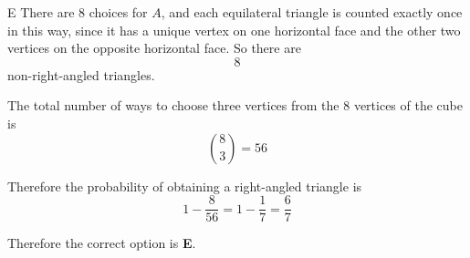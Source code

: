 \documentclass[11pt,a4paper]{article}
\begin{document}
\begin{enumerate}[label=\textbf{\arabic*.},leftmargin=*,itemsep=0pt,start=14]
\begin{djsSolution}{E}
There are $8$ choices for $A$, and each equilateral triangle is counted exactly once in this way, since it has a unique vertex on one horizontal face and the other two vertices on the opposite horizontal face. So there are
\[
8
\]
non-right-angled triangles.

The total number of ways to choose three vertices from the $8$ vertices of the cube is
\[
\binom{8}{3}=56
\]

Therefore the probability of obtaining a right-angled triangle is
\[
1-\frac{8}{56}=1-\frac17=\frac67
\]

Therefore the correct option is \textbf{E}.
\end{djsSolution}
\end{enumerate}
\clearpage
\thispagestyle{djssolutions}
\vspace*{8pt}
\end{document}
